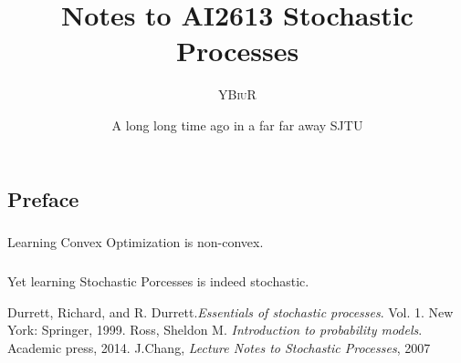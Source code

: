 \documentclass[oneside]{book}
\title{Notes to AI2613 Stochastic Processes}
\author{\textsc{YBiuR}}
\date{A long long time ago in a far far away SJTU}
\theoremstyle{definition}
\theoremstyle{remark}
\begin{document}
\begin{spacing}{1.2}
\setlength{\parskip}{1em}
\setlength{\parindent}{0em}

\frontmatter
\maketitle
\chapter*{Preface}
\paragraph{}Learning Convex Optimization is non-convex.
\paragraph{}Yet learning Stochastic Porcesses is indeed stochastic.
\mainmatter
\tableofcontents




\begin{thebibliography}{9}
     Durrett, Richard, and R. Durrett.\textit{Essentials of stochastic processes}. Vol. 1. New York: Springer, 1999.
     Ross, Sheldon M. \textit{Introduction to probability models}. Academic press, 2014.
     J.Chang, \textit{Lecture Notes to Stochastic Processes}, 2007
\end{thebibliography}

\end{spacing}
\end{document}
